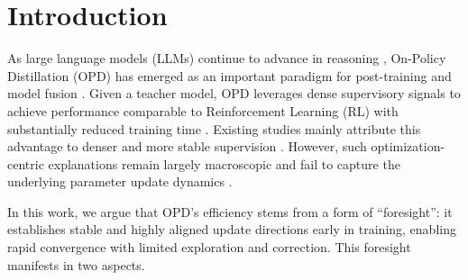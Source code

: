 \documentclass{llmxive}
\begin{document}
\section{Introduction}


As large language models (LLMs) continue to advance in reasoning \citep{OpenAI2025,deepseekai2025deepseekr1incentivizingreasoningcapability}, On-Policy Distillation (OPD) has emerged as an important paradigm for post-training and model fusion \citep{agarwal2024onpolicydistillationlanguagemodels,xiao2026mimo,deepseek2026v4}. Given a teacher model, OPD leverages dense supervisory signals to achieve performance comparable to Reinforcement Learning (RL) with substantially reduced training time \citep{Venkatkrishna2026AletheiaWM,yang2025qwen3technicalreport}. Existing studies mainly attribute this advantage to denser and more stable supervision \citep{he2026far,yue2025doesreinforcementlearningreally}. However, such optimization-centric explanations remain largely macroscopic and fail to capture the underlying parameter update dynamics \citep{zhang2025surveyreinforcementlearninglarge}.

In this work, we argue that OPD's efficiency stems from a form of ``foresight'': it establishes stable and highly aligned update directions early in training, enabling rapid convergence with limited exploration and correction. This foresight manifests in two aspects.
\end{document}
